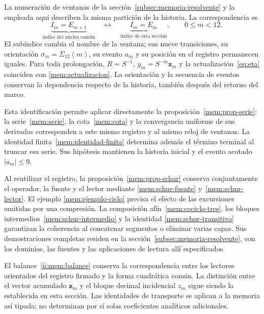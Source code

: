 La numeración de ventanas de la sección~\ref{subsec:memoria-resolvente}
y la empleada aquí describen la misma partición de la historia. La
correspondencia es
\[
 \underbrace{I_m=E_{m+1}}_{\text{índice del núcleo común}}
 \quad\longleftrightarrow\quad
 \underbrace{I_m=E_m}_{\text{índice de esta sección}},
 \qquad 0\leq m<12.
\]
El subíndice cambia el nombre de la ventana; sus nueve transiciones,
su orientación \(\sigma_m=\Sigma_{12}(m)\), su evento \(a_m\) y
su posición en el registro permanecen iguales. Para toda prolongación,
\(R=S^{-1}\), \(y_m=S^{-m}\mathbf z_m\) y la
actualización~\eqref{eq:eta} coinciden con
\eqref{mem:actualizacion}. La orientación y la secuencia de eventos
conservan la dependencia respecto de la historia, también después del
retorno del marco.

Esta identificación permite aplicar directamente la
proposición~\ref{mem:prop-serie}: la serie~\eqref{mem:serie}, la
cota~\eqref{mem:cota} y la convergencia uniforme de sus derivadas
corresponden a este mismo registro y al mismo reloj de ventanas. La
identidad finita~\eqref{mem:identidad-finita} determina además el término
terminal al truncar esa serie. Sus hipótesis mantienen la historia inicial
y el evento acotado \(|a_m|\leq9\).

Al reutilizar el registro, la proposición~\ref{mem:prop-schur} conserva
conjuntamente el operador, la fuente y el lector mediante
\eqref{mem:schur-fuente} y~\eqref{mem:schur-lector}. El ejemplo
\eqref{mem:ejemplo-ciclo} precisa el efecto de las excursiones omitidas
por una compresión. La composición afín~\eqref{mem:cociclo-tres}, los
bloques intermedios~\eqref{mem:schur-intermedio} y la identidad
\eqref{mem:schur-transitivo} garantizan la coherencia al concatenar
segmentos o eliminar varias capas. Sus demostraciones completas residen
en la sección~\ref{subsec:memoria-resolvente}, con los dominios, las
fuentes y las aplicaciones de lectura allí especificados.

El balance~\eqref{ii:mem:balance} conserva la correspondencia entre los
lectores orientados del registro firmado y la forma cuadrática común.
La distinción entre el vector acumulado \(\mathbf z_m\) y el bloque
decimal incidencial \(z_m\) sigue siendo la establecida en esta sección.
Las identidades de transporte se aplican a la memoria así tipada; no
determinan por sí solas coeficientes analíticos adicionales.
